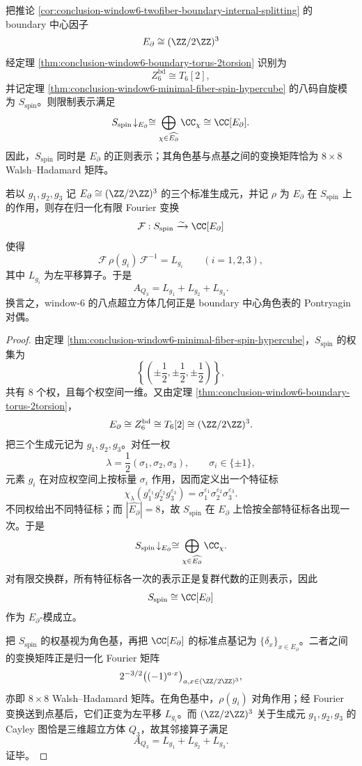 \begin{theorem}\label{thm:conclusion-window6-walsh-spin-duality}
把推论 \ref{cor:conclusion-window6-twofiber-boundary-internal-splitting} 的 boundary 中心因子
\[
E_{\partial}\cong (\ZZ/2\ZZ)^3
\]
经定理 \ref{thm:conclusion-window6-boundary-torus-2torsion} 识别为
\[
Z_6^{\mathrm{bd}}\cong T_6[2],
\]
并记定理 \ref{thm:conclusion-window6-minimal-fiber-spin-hypercube} 的八码自旋模为 \(S_{\mathrm{spin}}\)。则限制表示满足
\[
S_{\mathrm{spin}}\!\downarrow_{E_{\partial}}
\cong
\bigoplus_{\chi\in \widehat{E_{\partial}}}\CC_{\chi}
\cong
\CC[E_{\partial}].
\]
因此，\(S_{\mathrm{spin}}\) 同时是 \(E_{\partial}\) 的正则表示；其角色基与点基之间的变换矩阵恰为 \(8\times 8\) Walsh--Hadamard 矩阵。

若以 \(g_1,g_2,g_3\) 记 \(E_{\partial}\cong(\ZZ/2\ZZ)^3\) 的三个标准生成元，并记 \(\rho\) 为 \(E_{\partial}\) 在 \(S_{\mathrm{spin}}\) 上的作用，则存在归一化有限 Fourier 变换
\[
\mathcal F:S_{\mathrm{spin}}\xrightarrow{\sim}\CC[E_{\partial}]
\]
使得
\[
\mathcal F\,\rho(g_i)\,\mathcal F^{-1}=L_{g_i}
\qquad(i=1,2,3),
\]
其中 \(L_{g_i}\) 为左平移算子。于是
\[
A_{Q_3}=L_{g_1}+L_{g_2}+L_{g_3}.
\]
换言之，window-\(6\) 的八点超立方体几何正是 boundary 中心角色表的 Pontryagin 对偶。
\end{theorem}
\begin{proof}
由定理 \ref{thm:conclusion-window6-minimal-fiber-spin-hypercube}，\(S_{\mathrm{spin}}\) 的权集为
\[
\left\{
\left(\pm\frac12,\pm\frac12,\pm\frac12\right)
\right\},
\]
共有 \(8\) 个权，且每个权空间一维。又由定理 \ref{thm:conclusion-window6-boundary-torus-2torsion}，
\[
E_{\partial}\cong Z_6^{\mathrm{bd}}\cong T_6[2]\cong (\ZZ/2\ZZ)^3.
\]
把三个生成元记为 \(g_1,g_2,g_3\)。对任一权
\[
\lambda=\frac12(\sigma_1,\sigma_2,\sigma_3),
\qquad
\sigma_i\in\{\pm1\},
\]
元素 \(g_i\) 在对应权空间上按标量 \(\sigma_i\) 作用，因而定义出一个特征标
\[
\chi_{\lambda}(g_1^{\varepsilon_1}g_2^{\varepsilon_2}g_3^{\varepsilon_3})
=
\sigma_1^{\varepsilon_1}\sigma_2^{\varepsilon_2}\sigma_3^{\varepsilon_3}.
\]
不同权给出不同特征标；而 \(|\widehat{E_{\partial}}|=8\)，故 \(S_{\mathrm{spin}}\) 在 \(E_{\partial}\) 上恰按全部特征标各出现一次。于是
\[
S_{\mathrm{spin}}\!\downarrow_{E_{\partial}}
\cong
\bigoplus_{\chi\in \widehat{E_{\partial}}}\CC_{\chi}.
\]
对有限交换群，所有特征标各一次的表示正是复群代数的正则表示，因此
\[
S_{\mathrm{spin}}\cong \CC[E_{\partial}]
\]
作为 \(E_{\partial}\)-模成立。

把 \(S_{\mathrm{spin}}\) 的权基视为角色基，再把 \(\CC[E_{\partial}]\) 的标准点基记为 \(\{\delta_x\}_{x\in E_{\partial}}\)。二者之间的变换矩阵正是归一化 Fourier 矩阵
\[
2^{-3/2}\bigl((-1)^{a\cdot x}\bigr)_{a,x\in(\ZZ/2\ZZ)^3},
\]
亦即 \(8\times 8\) Walsh--Hadamard 矩阵。在角色基中，\(\rho(g_i)\) 对角作用；经 Fourier 变换送到点基后，它们正变为左平移 \(L_{g_i}\)。而 \((\ZZ/2\ZZ)^3\) 关于生成元 \(g_1,g_2,g_3\) 的 Cayley 图恰是三维超立方体 \(Q_3\)，故其邻接算子满足
\[
A_{Q_3}=L_{g_1}+L_{g_2}+L_{g_3}.
\]
证毕。
\end{proof}

